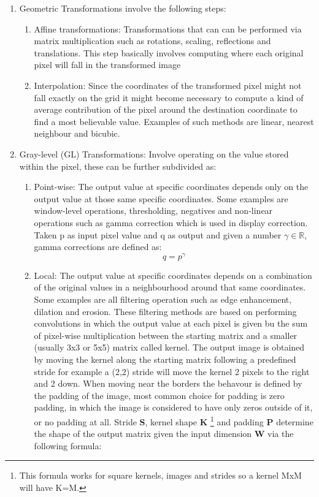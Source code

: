 \begin{enumerate}
\item Geometric Transformations involve the following steps:
		\begin{enumerate}
		\item Affine transformations: Transformations that can can be performed via matrix multiplication such as rotations, scaling, reflections and translations. This step basically involves computing where each original pixel will fall in the transformed image
		\item Interpolation: Since the coordinates of the transformed pixel might not fall exactly on the grid it might become necessary to compute a kind of average contribution of the pixel around the destination coordinate to find a most believable value. Examples of such methods are linear, nearest neighbour and bicubic.
		\end{enumerate}
\item Gray-level (GL) Transformations: Involve operating on the value stored within the pixel, these can be further subdivided as:
		\begin{enumerate}
		\item Point-wise: The output value at specific coordinates depends only on the output value at those same specific coordinates. Some examples are window-level operations, thresholding, negatives and non-linear operations such as gamma correction which is used in display correction. Taken p as input pixel value and q as output and given a number $\gamma \in \mathbb{R}$, gamma corrections are defined as:
		\begin{equation}
		q = p^{\gamma}
		\end{equation}
    \item Local: The output value at specific coordinates depends on a combination of the original values in a neighbourhood around that same coordinates. Some examples are all filtering operation such as edge enhancement, dilation and erosion. These filtering methods are based on performing convolutions in which the output value at each pixel is given bu the sum of pixel-wise multiplication between the starting matrix and a smaller (usually 3x3 or 5x5) matrix called kernel. The output image is obtained by moving the kernel along the starting matrix following a predefined stride for example a (2,2) stride will move the kernel 2 pixels to the right and 2 down.
When moving near the borders the behavour is defined by the padding of the image, most common choice for padding is zero padding, in which the image is considered to have only zeros outside of it, or no padding at all. 
Stride \textbf{S}, kernel shape \textbf{K}
\footnote{This formula works for square kernels, images and strides so a kernel MxM will have K=M.}
 and padding \textbf{P} determine the shape of the output matrix given the input dimension \textbf{W} via the following formula:


\end{enumerate}
\end{enumerate}
